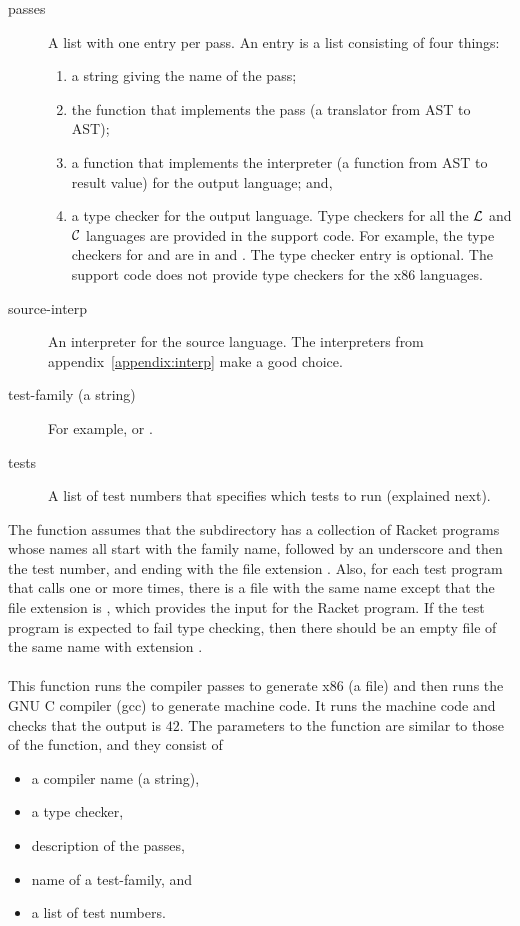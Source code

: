 \documentclass[7x10]{TimesAPriori_MIT}%
\numberwithin{theorem}{chapter}
\numberwithin{definition}{chapter}
\numberwithin{equation}{chapter}
\begin{document}
{\begin{description}
\item[passes] A list with one entry per pass.  An entry is a list
  consisting of four things:
  \begin{enumerate}
  \item a string giving the name of the pass;
  \item the function that implements the pass (a translator from AST
    to AST);
  \item a function that implements the interpreter (a function from
    AST to result value) for the output language; and,
  \item a type checker for the output language.  Type checkers for
    all the $\mathcal{L}{}$ and $\mathcal{C}{}$ languages are provided in the support code.
    For example, the type checkers for \LangVar{} and \LangCVar{} are in
     and . The
    type checker entry is optional.  The support code does not provide
    type checkers for the x86 languages.
  \end{enumerate}

\item[source-interp] An interpreter for the source language. The
  interpreters from appendix~\ref{appendix:interp} make a good choice.
  
\item[test-family (a string)] For example,   or .
\item[tests] A list of test numbers that specifies which tests to
  run (explained next).
\end{description}
%
The  function assumes that the subdirectory
 has a collection of Racket programs whose names all start
with the family name, followed by an underscore and then the test
number, and ending with the file extension . Also, for each test
program that calls  one or more times, there is a file with
the same name except that the file extension is , which
provides the input for the Racket program. If the test program is
expected to fail type checking, then there should be an empty file of
the same name with extension .


\paragraph{}

This function runs the compiler passes to generate x86 (a 
file) and then runs the GNU C compiler (gcc) to generate machine code.
It runs the machine code and checks that the output is $42$. The
parameters to the  function are similar to those
of the  function, and they consist of
\begin{itemize}
\item a compiler name (a string),
\item a type checker,
\item description of the passes,
\item name of a test-family, and
\item a list of test numbers.
\end{itemize}


}
\end{document}
